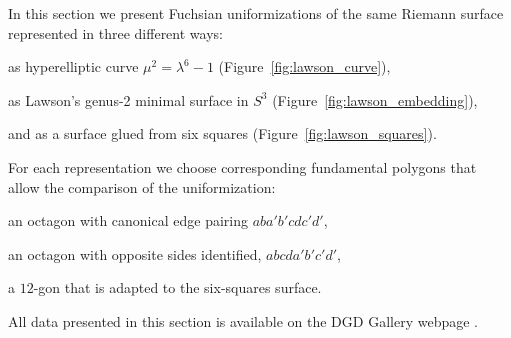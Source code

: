 \documentclass[Thesis]{subfiles}
\begin{document}
In this section we present Fuchsian uniformizations of the same
Riemann surface represented in three different ways:
\begin{compactitem}[$\bullet$]
\item 
  as hyperelliptic curve $\mu^2=\lambda^6-1$
  (Figure~\ref{fig:lawson_curve}),
\item as Lawson's genus-2 minimal surface
  in $S^3$ \cite{Law1970} (Figure~\ref{fig:lawson_embedding}),
\item and as
  a surface glued from six squares (Figure~\ref{fig:lawson_squares}).
\end{compactitem}
For each representation we choose corresponding fundamental polygons
that allow the comparison of the uniformization:
\begin{compactitem}[$\bullet$]
\item an octagon with canonical edge pairing $aba'b'cdc'd'$,
\item an octagon with opposite sides identified, $abcda'b'c'd'$,
\item a $12$-gon that is adapted to the six-squares surface. 
\end{compactitem}
All data presented
in this section is available on the {DGD Gallery} webpage
\cite{gallery-lawson-webpage}.

\end{document}
